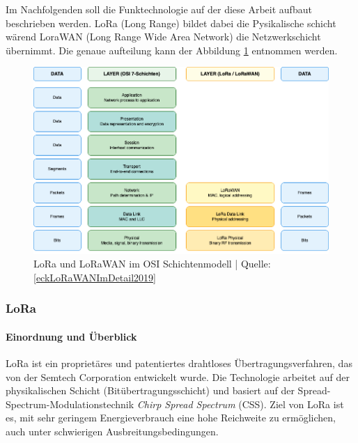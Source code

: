 Im Nachfolgenden soll die Funktechnologie auf der diese Arbeit aufbaut beschrieben werden. LoRa (Long Range) bildet dabei die Pysikalische schicht wärend LoraWAN (Long Range Wide Area Network) die Netzwerkschicht übernimmt. Die genaue aufteilung kann der Abbildung \ref{fig:lora-lorawan-osi} entnommen werden.

\begin{figure}[H]
\centering
\includegraphics[scale=.4]{figures/diagrams/LoraWAN_OSI.png}
\caption{LoRa und LoRaWAN im OSI Schichtenmodell | Quelle: \ref{eckLoRaWANImDetail2019}}
\label{fig:lora-lorawan-osi}
\end{figure}

\subsubsection*{LoRa}

\paragraph*{Einordnung und Überblick}  
LoRa ist ein proprietäres und patentiertes drahtloses Übertragungsverfahren, das von der Semtech Corporation entwickelt wurde. 
Die Technologie arbeitet auf der physikalischen Schicht (Bitübertragungsschicht) und basiert auf der Spread-Spectrum-Modulationstechnik \textit{Chirp Spread Spectrum} (CSS). 
Ziel von LoRa ist es, mit sehr geringem Energieverbrauch eine hohe Reichweite zu ermöglichen, auch unter schwierigen Ausbreitungsbedingungen. 

